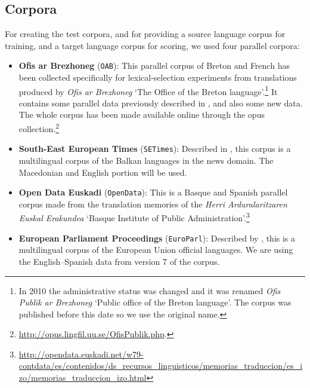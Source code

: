 \documentclass[11pt]{article}
\begin{document}
\subsection{Corpora}
\label{sec:eval-corpus}

For creating the test corpora, and for providing a source language corpus 
for training, and a target language corpus for scoring, we used four parallel corpora: 
\begin{itemize}
\item \textbf{Ofis ar Brezhoneg} (\texttt{OAB}): This parallel corpus
  of Breton and French has been collected specifically for
  lexical-selection experiments from translations produced by
  \emph{Ofis ar Brezhoneg} `The Office of the Breton
  language'.\footnote{In 2010 the administrative status was changed
    and it was renamed \emph{Ofis Publik ar Brezhoneg} `Public office
    of the Breton language'. The corpus was published before this date
    so we use the original name.}  It contains some parallel data
  previously described in \cite{tyers09b}, and also some new data. The
  whole corpus has been made available online through the {\sc opus}
  collection.\footnote{\url{http://opus.lingfil.uu.se/OfisPublik.php}.}
\item \textbf{South-East European Times} (\texttt{SETimes}): Described
  in \cite{tyers10}, this corpus is a multilingual corpus of the
  Balkan languages in the news domain. The Macedonian and English
  portion will be used.
\item \textbf{Open Data Euskadi} (\texttt{OpenData}): This is a Basque
  and Spanish parallel corpus made from the translation memories of
  the \emph{Herri Arduralaritzaren Euskal Erakundea} `Basque Institute
  of Public
  Administration'.\footnote{\url{http://opendata.euskadi.net/w79-contdata/es/contenidos/ds_recursos_linguisticos/memorias_traduccion/es_izo/memorias_traduccion_izo.html}}
\item \textbf{European Parliament Proceedings} (\texttt{EuroParl}):
  Described by \cite{koehn05a}, this is a multilingual corpus of the
  European Union official languages. We are using the English--Spanish
  data from version 7 of the corpus.
\end{itemize}
\end{document}
